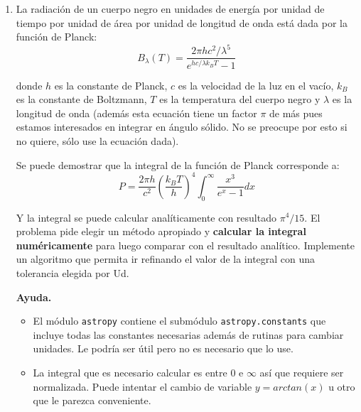 \documentclass[letter, 11pt]{article}
\begin{document}
\begin{enumerate}
  \item La radiación de un cuerpo negro en unidades de energía por unidad de
    tiempo por unidad de área por unidad de longitud de onda está dada por la
    función de Planck:
    $$B_\lambda(T) = \frac{2 \pi h c^2 / \lambda^5}{e^{hc/\lambda k_BT} - 1} $$

    donde $h$ es la constante de Planck, $c$ es la velocidad de la luz en el
    vacío, $k_B$ es la constante de Boltzmann, $T$ es la temperatura del cuerpo
    negro y $\lambda$ es la longitud de onda (además esta ecuación tiene un
    factor $\pi$ de más pues estamos interesados en integrar en ángulo sólido.
    No se preocupe por esto si no quiere, sólo use la ecuación dada).


    \begin{ayuda}

      Se puede demostrar que la integral de la función de Planck corresponde a:
      $$P = \frac{2 \pi h}{c^2} \left(\frac{k_BT}{h}\right)^4
      \int_0^\infty\frac{x^3}{e^x - 1} dx $$

      Y la integral se puede calcular analíticamente con resultado
      $\pi^4/15$. El problema pide elegir un método apropiado y {\bf calcular
      la integral numéricamente} para luego comparar con el resultado
      analítico.
      Implemente un algoritmo que permita ir refinando el valor de la
      integral con una tolerancia elegida por Ud.
    \end{ayuda}

    \begin{ayuda}
      \small
      {\bf Ayuda.}
      \begin{itemize}
        \item El módulo \texttt{astropy} contiene el submódulo
          \texttt{astropy.constants} que incluye todas las constantes
          necesarias además de rutinas para cambiar unidades. Le podría ser
          útil pero no es necesario que lo use.
        \item La integral que es necesario calcular es entre $0$ e $\infty$ así
          que requiere ser normalizada. Puede intentar el cambio de variable $y
          = arctan(x)$ u otro que le parezca conveniente.
      \end{itemize}
    \end{ayuda}


\end{enumerate}
\end{document}
